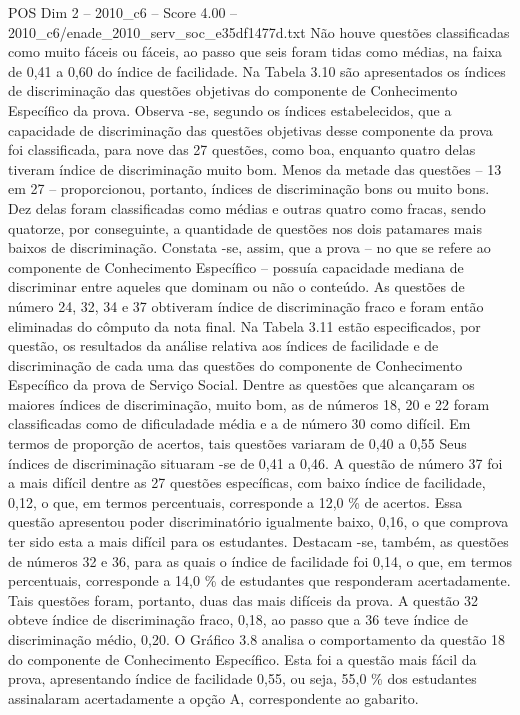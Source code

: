 \begin{textsample}{POS Dim 2 – 2010\_c6 – Score 4.00 – 2010\_c6/enade\_2010\_serv\_soc\_e35df1477d.txt}
Não houve questões classificadas como muito fáceis ou fáceis, ao passo que seis foram tidas como médias, na faixa de 0,41 a 0,60 do índice de facilidade.
Na Tabela 3.10 são apresentados os índices de discriminação das questões objetivas do componente de Conhecimento Específico da prova.
Observa -se, segundo os índices estabelecidos, que a capacidade de discriminação das questões objetivas desse componente da prova foi classificada, para nove das 27 questões, como boa, enquanto quatro delas tiveram índice de discriminação muito bom.
Menos da metade das questões – 13 em 27 – proporcionou, portanto, índices de discriminação bons ou muito bons.
Dez delas foram classificadas como médias e outras quatro como fracas, sendo quatorze, por conseguinte, a quantidade de questões nos dois patamares mais baixos de discriminação.
Constata -se, assim, que a prova – no que se refere ao componente de Conhecimento Específico – possuía capacidade mediana de discriminar entre aqueles que dominam ou não o conteúdo.
As questões de número 24, 32, 34 e 37 obtiveram índice de discriminação fraco e foram então eliminadas do cômputo da nota final.
Na Tabela 3.11 estão especificados, por questão, os resultados da análise relativa aos índices de facilidade e de discriminação de cada uma das questões do componente de Conhecimento Específico da prova de Serviço Social.
Dentre as questões que alcançaram os maiores índices de discriminação, muito bom, as de números 18, 20 e 22 foram classificadas como de dificuladade média e a de número 30 como difícil.
Em termos de proporção de acertos, tais questões variaram de 0,40 a 0,55 Seus índices de discriminação situaram -se de 0,41 a 0,46.
A questão de número 37 foi a mais difícil dentre as 27 questões específicas, com baixo índice de facilidade, 0,12, o que, em termos percentuais, corresponde a 12,0 \% de acertos.
Essa questão apresentou poder discriminatório igualmente baixo, 0,16, o que comprova ter sido esta a mais difícil para os estudantes.
Destacam -se, também, as questões de números 32 e 36, para as quais o índice de facilidade foi 0,14, o que, em termos percentuais, corresponde a 14,0 \% de estudantes que responderam acertadamente.
Tais questões foram, portanto, duas das mais difíceis da prova.
A questão 32 obteve índice de discriminação fraco, 0,18, ao passo que a 36 teve índice de discriminação médio, 0,20.
O Gráfico 3.8 analisa o comportamento da questão 18 do componente de Conhecimento Específico.
Esta foi a questão mais fácil da prova, apresentando índice de facilidade 0,55, ou seja, 55,0 \% dos estudantes assinalaram acertadamente a opção A, correspondente ao gabarito.

\end{textsample}
